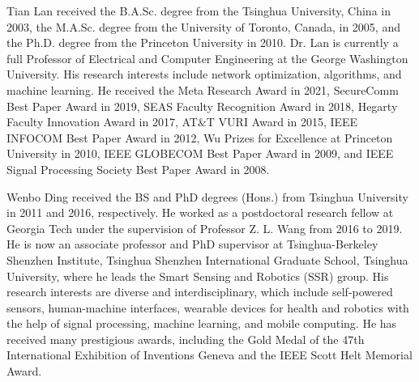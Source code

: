 \documentclass[lettersize,journal]{IEEEtran}
\begin{document}
\vspace{-20pt}
\begin{IEEEbiography}
 {Tian Lan}
received the B.A.Sc. degree from the Tsinghua University, China in 2003, the M.A.Sc. degree from the University of Toronto, Canada, in 2005, and the Ph.D. degree from the Princeton University in 2010. Dr. Lan is currently a full Professor of Electrical and Computer Engineering at the George Washington University. His research interests include network optimization, algorithms, and machine learning. He received the Meta Research Award in 2021, SecureComm Best Paper Award in 2019, SEAS Faculty Recognition Award in 2018, Hegarty Faculty Innovation Award in 2017, AT\&T VURI Award in 2015, IEEE INFOCOM Best Paper Award in 2012,  Wu Prizes for Excellence at Princeton University in 2010, IEEE GLOBECOM Best Paper Award in 2009, and IEEE Signal Processing Society Best Paper Award in 2008.
\end{IEEEbiography}
\vspace{-20pt}
\begin{IEEEbiography}
 {Wenbo Ding}
received the BS and PhD degrees (Hons.) from Tsinghua University in 2011 and 2016, respectively. He worked as a postdoctoral research fellow at Georgia Tech under the supervision of Professor Z. L. Wang from 2016 to 2019. He is now an associate professor and PhD supervisor at Tsinghua-Berkeley Shenzhen Institute, Tsinghua Shenzhen International Graduate School, Tsinghua University, where he leads the Smart Sensing and Robotics (SSR) group. His research interests are diverse and interdisciplinary, which include self-powered sensors, human-machine interfaces, wearable devices for health and robotics with the help of signal processing, machine learning, and mobile computing. He has received many prestigious awards, including the Gold Medal of the 47th International Exhibition of Inventions Geneva and the IEEE Scott Helt Memorial Award. 
\end{IEEEbiography}
\vspace{-20pt}
\end{document}
